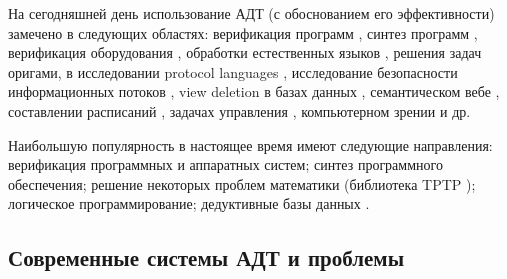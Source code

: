 На сегодняшней день использование АДТ (с обоснованием его эффективности) замечено в следующих областях: верификация программ \cite{keyproj}, синтез программ \cite{Butakov1}, верификация оборудования \cite{ACL2}, обработки естественных языков \cite{ATP_NLP}, решения задач оригами\cite{Origami}, в исследовании protocol languages \cite{TPTP}, исследование безопасности информационных потоков \cite{ATP_Flow}, view deletion в базах данных \cite{ATP_DB}, семантическом вебе \cite{TPTP}, составлении расписаний \cite{TPTP}, задачах управления \cite{ICDS2000}, компьютерном зрении \cite{ATP_Vision} и др.

Наибольшую популярность в настоящее время имеют следующие направления: верификация программных и аппаратных систем; синтез программного обеспечения; решение некоторых проблем математики (библиотека TPTP \cite{TPTP}); логическое программирование; дедуктивные базы данных \cite{ontobox}.

\subsection{Современные системы АДТ и проблемы}

